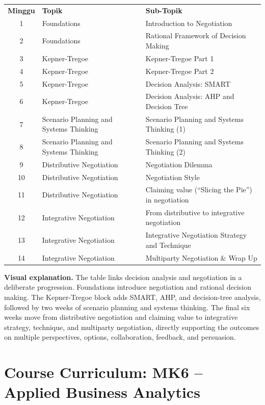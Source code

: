 \documentclass[10pt]{article}
\newcommand{\visualexplanation}[1]{%
  \begin{tcolorbox}[colback=lightgray,colframe=navy!35,boxrule=0.5pt,
    arc=2mm,left=2mm,right=2mm,top=1.5mm,bottom=1.5mm]
  \textbf{Visual explanation.} #1
  \end{tcolorbox}}
\begin{document}
\begin{center}\small
\begin{tabularx}{\textwidth}{c L{5.0cm} Y}
\color{white}\bfseries Minggu & \color{white}\bfseries Topik & \color{white}\bfseries Sub-Topik\\
1 & Foundations & Introduction to Negotiation\\
2 & Foundations & Rational Framework of Decision Making\\
3 & Kepner-Tregoe & Kepner-Tregoe Part 1\\
4 & Kepner-Tregoe & Kepner-Tregoe Part 2\\
5 & Kepner-Tregoe & Decision Analysis: SMART\\
6 & Kepner-Tregoe & Decision Analysis: AHP and Decision Tree\\
7 & Scenario Planning and Systems Thinking & Scenario Planning and Systems Thinking (1)\\
8 & Scenario Planning and Systems Thinking & Scenario Planning and Systems Thinking (2)\\
9 & Distributive Negotiation & Negotiation Dilemma\\
10 & Distributive Negotiation & Negotiation Style\\
11 & Distributive Negotiation & Claiming value (``Slicing the Pie'') in negotiation\\
12 & Integrative Negotiation & From distributive to integrative negotiation\\
13 & Integrative Negotiation & Integrative Negotiation Strategy and Technique\\
14 & Integrative Negotiation & Multiparty Negotiation \& Wrap Up\\
\end{tabularx}
\end{center}

\visualexplanation{The table links decision analysis and negotiation in a deliberate progression. Foundations introduce negotiation and rational decision making. The Kepner-Tregoe block adds SMART, AHP, and decision-tree analysis, followed by two weeks of scenario planning and systems thinking. The final six weeks move from distributive negotiation and claiming value to integrative strategy, technique, and multiparty negotiation, directly supporting the outcomes on multiple perspectives, options, collaboration, feedback, and persuasion.}

\section{Course Curriculum: MK6 -- Applied Business Analytics}
\end{document}
